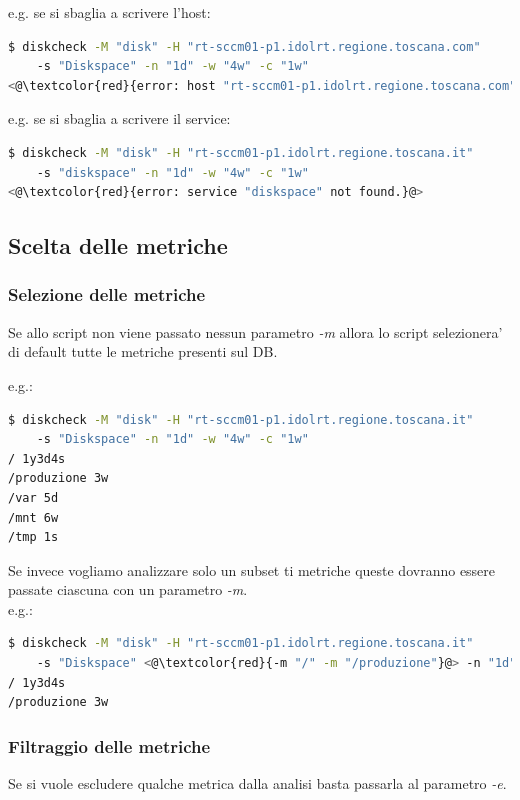 \documentclass{article}
\begin{document}
e.g. se si sbaglia a scrivere l'host:
\begin{lstlisting}[language=Bash]
$ diskcheck -M "disk" -H "rt-sccm01-p1.idolrt.regione.toscana.com" 
    -s "Diskspace" -n "1d" -w "4w" -c "1w"
<@\textcolor{red}{error: host "rt-sccm01-p1.idolrt.regione.toscana.com" not found.}@>
\end{lstlisting}

e.g. se si sbaglia a scrivere il service:
\begin{lstlisting}[language=Bash]
$ diskcheck -M "disk" -H "rt-sccm01-p1.idolrt.regione.toscana.it" 
    -s "diskspace" -n "1d" -w "4w" -c "1w"
<@\textcolor{red}{error: service "diskspace" not found.}@>
\end{lstlisting}

\clearpage
\subsection*{Scelta delle metriche}
\subsubsection*{Selezione delle metriche}
Se allo script non viene passato nessun parametro \textit{-m} allora lo script selezionera' di default tutte le metriche presenti sul DB.

e.g.:
\begin{lstlisting}[language=Bash]
$ diskcheck -M "disk" -H "rt-sccm01-p1.idolrt.regione.toscana.it" 
    -s "Diskspace" -n "1d" -w "4w" -c "1w"
/ 1y3d4s
/produzione 3w
/var 5d
/mnt 6w
/tmp 1s
\end{lstlisting}

Se invece vogliamo analizzare solo un subset ti metriche queste dovranno essere passate ciascuna con un parametro \textit{-m}.\\

e.g.:
\begin{lstlisting}[language=Bash]
$ diskcheck -M "disk" -H "rt-sccm01-p1.idolrt.regione.toscana.it" 
    -s "Diskspace" <@\textcolor{red}{-m "/" -m "/produzione"}@> -n "1d" -w "4w" -c "1w"
/ 1y3d4s
/produzione 3w
\end{lstlisting}

\subsubsection*{Filtraggio delle metriche}
Se si vuole escludere qualche metrica dalla analisi basta passarla al parametro \textit{-e}.\\
\end{document}
